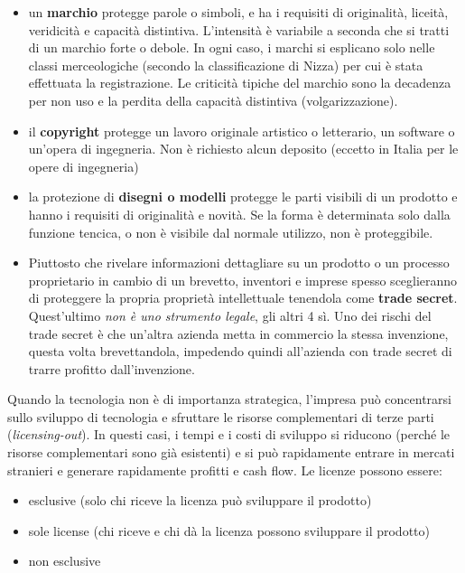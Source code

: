 \documentclass[answers, a4paper, 11pt]{exam}
\begin{document}
\begin{itemize}
    \item un \textbf{marchio} protegge parole o simboli, e ha i requisiti di originalità, liceità, veridicità e capacità distintiva. L'intensità è variabile a seconda che si tratti di un marchio forte o debole. In ogni caso, i marchi si esplicano solo nelle classi merceologiche (secondo la classificazione di Nizza) per cui è stata effettuata la registrazione.
    Le criticità tipiche del marchio sono la decadenza per non uso e la perdita della capacità distintiva (volgarizzazione).
    \item il \textbf{copyright} protegge un lavoro originale artistico o letterario, un software o un'opera di ingegneria. Non è richiesto alcun deposito (eccetto in Italia per le opere di ingegneria)
    \item la protezione di \textbf{disegni o modelli} protegge le parti visibili di un prodotto e hanno i requisiti di originalità e novità. Se la forma è determinata solo dalla funzione tencica, o non è visibile dal normale utilizzo, non è proteggibile.
    \item Piuttosto che rivelare informazioni dettagliare su un prodotto o un processo proprietario in cambio di un brevetto, inventori e imprese spesso sceglieranno di proteggere la propria proprietà intellettuale tenendola come \textbf{trade secret}. 
    Quest'ultimo \emph{non è uno strumento legale}, gli altri 4 sì.
    Uno dei rischi del trade secret è che un'altra azienda metta in commercio la stessa invenzione, questa volta brevettandola, impedendo quindi all'azienda con trade secret di trarre profitto dall'invenzione.
\end{itemize}

Quando la tecnologia non è di importanza strategica, l'impresa può concentrarsi sullo sviluppo di tecnologia e sfruttare le risorse complementari di terze parti (\emph{licensing-out}).
In questi casi, i tempi e i costi di sviluppo si riducono (perché le risorse complementari sono già esistenti) e si può rapidamente entrare in mercati stranieri e generare rapidamente profitti e cash flow. 
Le licenze possono essere:

\begin{itemize}
    \item esclusive (solo chi riceve la licenza può sviluppare il prodotto)
    \item sole license (chi riceve e chi dà la licenza possono sviluppare il prodotto)
    \item non esclusive
\end{itemize}
\end{document}
